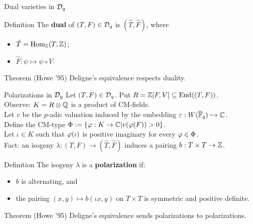 \documentclass{beamer}
\begin{document}
\begin{frame}{Dual varieties in ${\mathcal D}_q$}
\pause
  \begin{block}{Definition}
    The \textbf{dual} of $(T,F)\in {\mathcal D}_q$ is $(\hat T,\hat F)$, where
    \begin{itemize}
      \item $\hat T = \operatorname{Hom}_{\mathbb{Z}}(T,\mathbb{Z})$;
      \item $\hat F: \psi \mapsto \psi\circ V$.
    \end{itemize}
  \end{block}
\pause
  \begin{alertblock}{Theorem (Howe '95)}
    Deligne's equivalence respects duality.
  \end{alertblock}
\end{frame}

\begin{frame}{Polarizations in ${\mathcal D}_q$}
  Let $(T,F) \in {\mathcal D}_q$. Put $R=\mathbb{Z}[F,V]\subseteq \operatorname{End}((T,F))$.\\
\pause
  Observe: $K=R\otimes \mathbb{Q}$ is a product of CM-fields.\\
\pause
  Let $v$ be the $p$-adic valuation induced by the embedding $\varepsilon: W(\overline {\mathbb{F}}_q)\hookrightarrow \mathbb{C}$.\\
\pause
  Define the CM-type $\Phi:=\left\lbrace{\varphi}:K\to \mathbb{C} | v({\varphi}(F))>0\right\rbrace$.\\
\pause
  Let $\iota \in K$ such that ${\varphi}(\iota)$ is positive imaginary for every ${\varphi} \in \Phi$.\\
\pause
  Fact: an isogeny $\lambda: (T,F) \to (\hat T, \hat F)$ induces a pairing $b:T\times T \to \mathbb{Z}$.
\pause
  \begin{block}{Definition}
    The isogeny $\lambda$ is a \textbf{polarization} if:
    \begin{itemize}
      \item $b$ is alternating, and
      \item the pairing $(x,y)\mapsto b(\iota x,y)$ on $T\times T$ is symmetric and positive definite.
    \end{itemize}
  \end{block}
\pause
  \begin{alertblock}{Theorem (Howe '95)}
    Deligne's equivalence sends polarizations to polarizations.
  \end{alertblock}
\end{frame}
\end{document}
